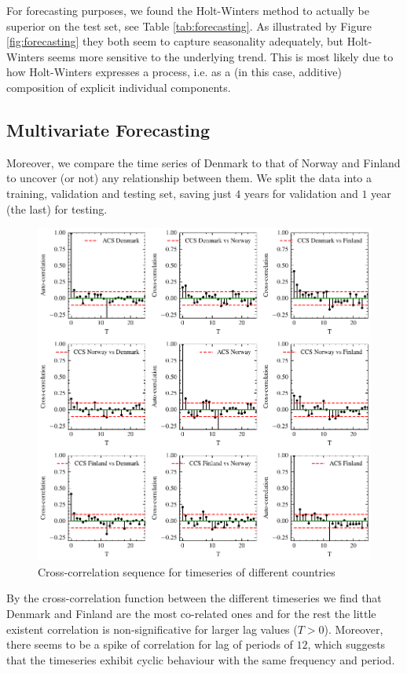 \documentclass[conference]{IEEEtran}
\begin{document}
For forecasting purposes, we found the Holt-Winters method to actually be superior on the test set, see Table \ref{tab:forecasting}. As illustrated by Figure \ref{fig:forecasting} they both seem to capture seasonality adequately, but Holt-Winters seems more sensitive to the underlying trend. This is most likely due to how Holt-Winters expresses a process, i.e. as a (in this case, additive) composition of explicit individual components.
\subsection{Multivariate Forecasting}

Moreover, we compare the time series of Denmark to that of Norway and Finland to uncover (or not) any relationship between them. We split the data into a training, validation and testing set, saving just $4$ years for validation and $1$ year (the last) for testing.

\begin{figure}[hbtp]
    \centering
    \includegraphics{../figs/cross_correlation_seq.pdf}
    \caption{Cross-correlation sequence for timeseries of different countries}
    \label{fig:cross_correlation_seq}
\end{figure}

By the cross-correlation function between the different timeseries we find that Denmark and Finland are the most co-related ones and for the rest the little existent correlation is non-significative for larger lag values ($T>0$). Moreover, there seems to be a spike of correlation for lag of periods of $12$, which suggests that the timeseries exhibit cyclic behaviour with the same frequency and period.
\end{document}
